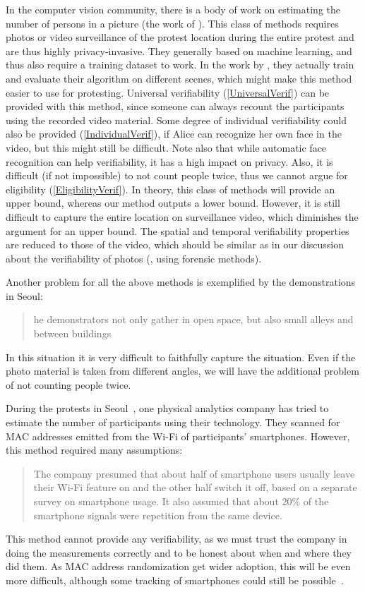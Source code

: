 In the computer vision community, there is a body of work on estimating the number of persons in a picture (\eg the work of 
\citet{NNCrowdCounting}).
This class of methods requires photos or video surveillance of the protest location during the entire protest and are thus highly privacy-invasive.
They generally based on machine learning, and thus also require a training dataset to work.
In the work by \citet{NNCrowdCounting}, they actually train and evaluate their algorithm on different scenes, which might make this method easier to use for protesting.
Universal verifiability (\cref{UniversalVerif}) can be provided with this method, since someone can always recount the participants using the recorded video material.
Some degree of individual verifiability could also be provided (\cref{IndividualVerif}), if Alice can recognize her own face in the video, but this might still be difficult. 
Note also that while automatic face recognition can help verifiability, it has a high impact on privacy.
Also, it is difficult (if not impossible) to not count people twice, thus we cannot argue for eligibility (\cref{EligibilityVerif}).
In theory, this class of methods will provide an upper bound, whereas our method outputs a lower bound.
However, it is still difficult to capture the entire location on surveillance video, which diminishes the argument for an upper bound.
The spatial and temporal verifiability properties are reduced to those of the video, which should be similar as in our discussion about the verifiability of photos (\ie, using forensic methods).

Another problem for all the above methods is exemplified by the demonstrations 
in Seoul:
\blockcquote{2016DemonstrationsInSeoul}{%
  he demonstrators not only gather in open space, but also small 
  alleys and between buildings%
}.
In this situation it is very difficult to faithfully capture the situation.
Even if the photo material is taken from different angles, we will have the additional problem of not counting people twice.

During the protests in Seoul~\cite{2016DemonstrationsInSeoul}, one physical analytics company has tried to estimate the number of participants using their technology.
They scanned for MAC addresses emitted from the Wi-Fi of participants' smartphones.
However, this method required many assumptions:
\blockcquote{2016DemonstrationsInSeoul}{%
  The company presumed that about half of smartphone users usually leave their Wi-Fi feature on and the other half switch it off, based on a separate survey on smartphone usage. 
It also assumed that about 20\% of the smartphone signals were repetition from the same device.
}
This method cannot provide any verifiability, as we must trust the company in doing the measurements correctly and to be honest about when and where they did them.
As MAC address randomization get wider adoption, this will be even more difficult, although some tracking of smartphones could still be possible~\cite{WhyMACRandomizationIsNotEnough}.


